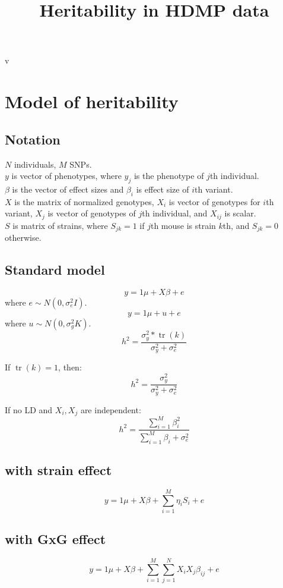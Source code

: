 \documentclass[12pt]{article}
\DeclareMathOperator{\tr}{tr}
\begin{document}
\title{Heritability in HDMP data}
v

\section{Model of heritability}
\subsection{Notation}
$N$ individuals, $M$ SNPs.\\
$y$ is vector of phenotypes, where $y_{j}$ is the phenotype of $j$th individual.\\
$\beta$ is the vector of effect sizes and $\beta_i$ is effect size of $i$th variant.\\
$X$ is the matrix of normalized genotypes, $X_i$ is vector of genotypes for $i$th variant, $X_j$ is vector of genotypes of $j$th individual, and $X_{ij}$ is scalar.\\
$S$ is matrix of strains, where $S_{jk} = 1$ if $j$th mouse is strain $k$th, and $S_{jk} = 0$ otherwise. \\

\subsection{Standard model}

\begin{equation}
y = 1 \mu + X \beta + e
\end{equation}
where $e \sim N(0, \sigma_e^2 I)$.\\

\begin{equation}
y = 1\mu + u + e
\end{equation}
where $u \sim N(0,\sigma_g^2 K)$.\\

\begin{equation}
h^2 = \frac {\sigma_y^2 * \tr(k)} {\sigma_y^2 + \sigma_e^2}
\end{equation}

If $\tr(k) = 1$, then: 
\begin{equation} 
h^2 = \frac {\sigma_y^2} {\sigma_y^2 + \sigma_e^2}
\end{equation}


If no LD and $X_i, X_j$ are independent:
\begin{equation}
h^2 = \frac {\sum\limits_{i=1}^{M}{\beta_i^2}} {\sum\limits_{i=1}^{M}{\beta_i} + \sigma_e^2}
\end{equation}


\subsection{with strain effect}

\begin{equation}
y = 1 \mu + X \beta + \sum\limits_{i=1}^{M}{\eta_i S_i} + e
\end{equation}

\subsection{with GxG effect}
\begin{equation}
y = 1 \mu + X \beta + \sum\limits_{i=1}^{M} \sum\limits_{j=1}^{N}{X_i X_j \beta_{ij}}+  e
\end{equation}
\end{document}
